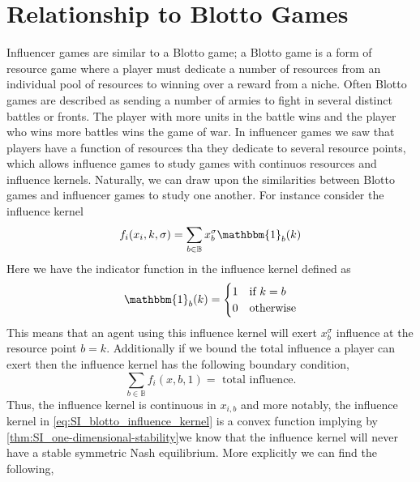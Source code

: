\documentclass{article}
\begin{document}
    \section{Relationship to Blotto Games}
                Influencer games are similar to a Blotto game; a Blotto game is a form of resource game where a player must dedicate a number of resources from an individual pool of resources to winning over a reward from a niche. Often Blotto games are described as sending a number of armies to fight in several distinct battles or fronts. The player with more units in the battle wins and the player who wins more battles wins the game of war. In influencer games we saw that players have a function of resources tha they dedicate to several resource points, which allows influence games to study games with continuos resources and influence kernels. Naturally, we can draw upon the similarities between Blotto games and influencer games to study one another. For instance consider the influence kernel 
                \begin{equation}\label{eq:SI_blotto_influence_kernel}
                    f_i(x_i,k,\sigma)=\sum_{b\in \mathbb{B}}x^\sigma_b \mathbbm{1}_{b}(k)
                \end{equation}
                Here we have the indicator function in the influence kernel defined as
                \begin{equation}
                    \mathbbm{1}_{b}(k)=\begin{cases}
                        1 & \text{if } k=b\\
                        0 & \text{otherwise}
                    \end{cases}
                \end{equation}
                This means that an agent using this influence kernel will exert $x^\sigma_b$ influence at the resource point $b=k$. Additionally if we bound the total influence a player can exert then the influence kernel has the following boundary condition,
                \begin{equation}
                    \sum_{b\in \mathbb{B}}f_i(x,b,1)=\text{ total influence}.
                \end{equation}
                Thus, the influence kernel is continuous in $x_{i,b}$ and more notably, the influence kernel in \cref{eq:SI_blotto_influence_kernel} is a convex function implying by \cref{thm:SI_one-dimensional-stability}we know that the influence kernel will never have a stable symmetric Nash equilibrium.  More explicitly we can find the following,
\end{document}
